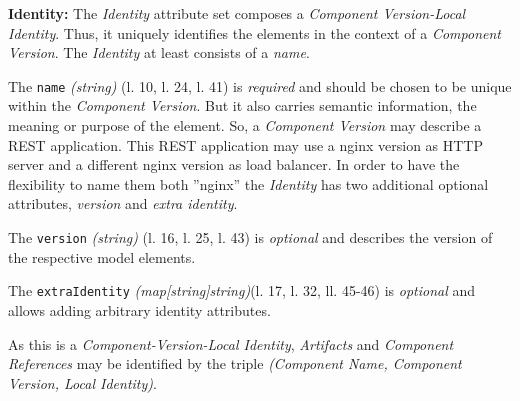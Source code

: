 \textbf{Identity:} The \emph{Identity} attribute set composes a \emph{Component Version-Local Identity}. Thus, it uniquely identifies the elements in the context of a \emph{Component Version}. The \emph{Identity} at least consists of a \emph{name}.\par 
The \lstinline|name| \emph{(string)}  (l. 10, l. 24, l. 41) is \emph{required} and should be chosen to be unique within the \emph{Component Version}. But it also carries semantic information, the meaning or purpose of the element. So, a \emph{Component Version} may describe a REST application. This REST application may use a nginx version as HTTP server and a different nginx version as load balancer. In order to have the flexibility to name them both ''nginx'' the \emph{Identity} has two additional optional attributes, \emph{version} and \emph{extra identity}.\par
The \lstinline|version| \emph{(string)} (l. 16, l. 25, l. 43) is \emph{optional} and describes the version of the respective model elements.\par
The \lstinline|extraIdentity| \emph{(map[string]string)}(l. 17, l. 32, ll. 45-46) is \emph{optional} and allows adding arbitrary identity attributes.\par
As this is a \emph{Component-Version-Local Identity}, \emph{Artifacts} and \emph{Component References} may be identified by the triple \emph{({Component Name}, {Component Version}, {Local Identity})}.\\

